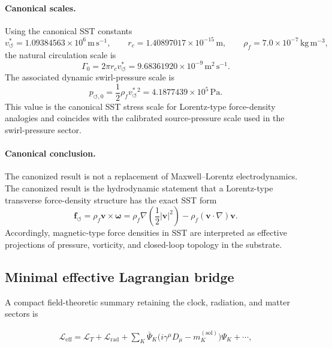 \documentclass[11pt]{article}
\theoremstyle{definition}
\theoremstyle{plain}
\theoremstyle{remark}
\newcommand{\rhoF}{{\rho_{\!f}}}
\newcommand{\rc}{{r_c}}
\newcommand{\vchar}{v_{\!\boldsymbol{\circlearrowleft}}^{\ast}}
\begin{document}
        \paragraph{Canonical scales.}
        Using the canonical SST constants
        \[
        \vchar
        =
        1.09384563\times10^6\,\mathrm{m\,s^{-1}},
        \qquad
        \rc
        =
        1.40897017\times10^{-15}\,\mathrm m,
        \qquad
        \rhoF
        =
        7.0\times10^{-7}\,\mathrm{kg\,m^{-3}},
        \]
        the natural circulation scale is
        \[
        \Gamma_0
        =
        2\pi \rc\vchar
        =
        9.68361920\times10^{-9}\,\mathrm{m^2\,s^{-1}}.
        \]
        The associated dynamic swirl-pressure scale is
        \[
        p_{\circlearrowleft,0}
        =
        \frac12\rhoF\vchar^2
        =
        4.1877439\times10^{5}\,\mathrm{Pa}.
        \]
        This value is the canonical SST stress scale for Lorentz-type
        force-density analogies and coincides with the calibrated source-pressure
        scale used in the swirl-pressure sector.

        \paragraph{Canonical conclusion.}
        The canonized result is not a replacement of Maxwell--Lorentz electrodynamics.
        The canonized result is the hydrodynamic statement that a Lorentz-type
        transverse force-density structure has the exact SST form
        \[
        \boxed{
        \mathbf f_{\circlearrowleft}
        =
        \rhoF\mathbf v\times\boldsymbol{\omega}
        =
        \rhoF
        \nabla\!\left(\frac12|\mathbf v|^2\right)
        -
        \rhoF(\mathbf v\cdot\nabla)\mathbf v .
        }
        \]
        Accordingly, magnetic-type force densities in SST are interpreted as
        effective projections of pressure, vorticity, and closed-loop topology in the
        substrate.

    \subsection{Minimal effective Lagrangian bridge}

        A compact field-theoretic summary retaining the clock, radiation, and matter sectors is

        \begin{align}
            \mathcal{L}_{\mathrm{eff}}
            =
            \mathcal{L}_{T}
            +
            \mathcal{L}_{\mathrm{rad}}
            +
            \sum_K \bar\Psi_K\bigl(i\gamma^\mu D_\mu - m_K^{(\mathrm{sol})}\bigr)\Psi_K
            + \cdots,
            \label{eq:minimal_effective_lagrangian_bridge}
        \end{align}
\end{document}

